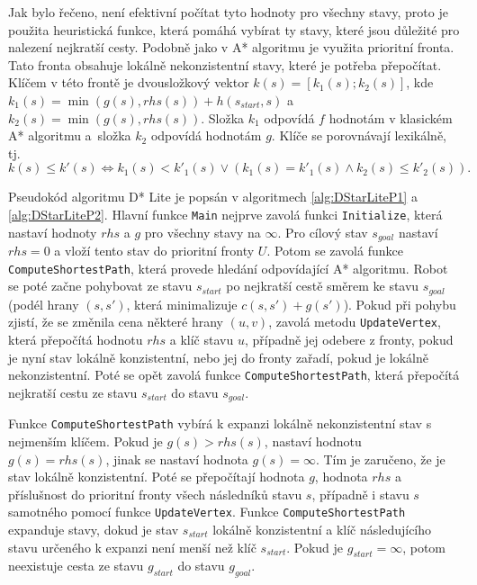 Jak bylo řečeno, není efektivní počítat tyto hodnoty pro všechny stavy, proto je použita heuristická funkce, která pomáhá vybírat ty stavy, které jsou důležité pro nalezení nejkratší cesty. Podobně jako v A* algoritmu je využita prioritní fronta. Tato fronta obsahuje lokálně nekonzistentní stavy, které je potřeba přepočítat. Klíčem v této frontě je dvousložkový vektor $k(s)=[k_1(s);k_2(s)]$, kde $k_1(s)=\min(g(s),rhs(s))+h(s_{start},s)$ a~$k_2(s)=\min(g(s),rhs(s))$. Složka $k_1$ odpovídá $f$ hodnotám v klasickém A* algoritmu a~složka $k_2$ odpovídá hodnotám $g$. Klíče se porovnávají lexikálně, tj. $$k(s)\leq k'(s)\Leftrightarrow k_1(s)<k'_1(s)\vee (k_1(s)=k'_1(s)\wedge k_2(s)\leq k'_2(s)).$$

Pseudokód algoritmu D* Lite je popsán v algoritmech \ref{alg:DStarLiteP1} a \ref{alg:DStarLiteP2}. Hlavní funkce \texttt{Main} nejprve zavolá funkci \texttt{Initialize}, která nastaví hodnoty $rhs$ a $g$ pro všechny stavy na $\infty$. Pro cílový stav $s_{goal}$ nastaví $rhs=0$ a vloží tento stav do prioritní fronty $U$. Potom se zavolá funkce \texttt{ComputeShortestPath}, která provede hledání odpovídající A* algoritmu. Robot se poté začne pohybovat ze stavu $s_{start}$ po nejkratší cestě směrem ke stavu $s_{goal}$ (podél hrany $(s,s')$, která minimalizuje $c(s,s')+g(s')$). Pokud při pohybu zjistí, že se změnila cena některé hrany $(u,v)$, zavolá metodu \texttt{UpdateVertex}, která přepočítá hodnotu $rhs$ a klíč stavu $u$, případně jej odebere z fronty, pokud je nyní stav lokálně konzistentní, nebo jej do fronty zařadí, pokud je lokálně nekonzistentní. Poté se opět zavolá funkce \texttt{ComputeShortestPath}, která přepočítá nejkratší cestu ze stavu $s_{start}$ do stavu $s_{goal}$.

Funkce \texttt{ComputeShortestPath} vybírá k expanzi lokálně nekonzistentní stav s nejmenším klíčem. Pokud je $g(s)>rhs(s)$, nastaví hodnotu $g(s)=rhs(s)$, jinak se nastaví hodnota $g(s)=\infty$. Tím je zaručeno, že je stav lokálně konzistentní. Poté se přepočítají hodnota $g$, hodnota $rhs$ a příslušnost do prioritní fronty všech následníků stavu $s$, případně i stavu $s$ samotného pomocí funkce \texttt{UpdateVertex}. Funkce \texttt{ComputeShortestPath} expanduje stavy, dokud je stav $s_{start}$ lokálně konzistentní a klíč následujícího stavu určeného k expanzi není menší než klíč $s_{start}$. Pokud je $g_{start}=\infty$, potom neexistuje cesta ze stavu $g_{start}$ do stavu $g_{goal}$.

